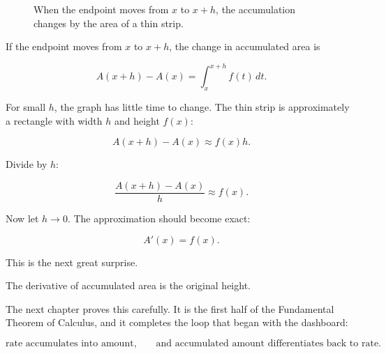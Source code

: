 \begin{figure}[h]
\centering
{}
\caption{When the endpoint moves from \(x\) to \(x+h\), the accumulation changes by the area of a thin strip.}
\label{fig:accumulation-moving-endpoint-hook}
\end{figure}

If the endpoint moves from \(x\) to \(x+h\), the change in accumulated area is

\[
A(x+h)-A(x)
=
\int_x^{x+h} f(t)\,dt.
\]

For small \(h\), the graph has little time to change.  The thin strip is approximately a
rectangle with width \(h\) and height \(f(x)\):

\[
A(x+h)-A(x)\approx f(x)h.
\]

Divide by \(h\):

\[
\frac{A(x+h)-A(x)}{h}\approx f(x).
\]

Now let \(h\to0\).  The approximation should become exact:

\[
A'(x)=f(x).
\]

This is the next great surprise.

The derivative of accumulated area is the original height.

The next chapter proves this carefully.  It is the first half of the Fundamental Theorem
of Calculus, and it completes the loop that began with the dashboard:

\[
\text{rate accumulates into amount},
\qquad
\text{and accumulated amount differentiates back to rate.}
\]